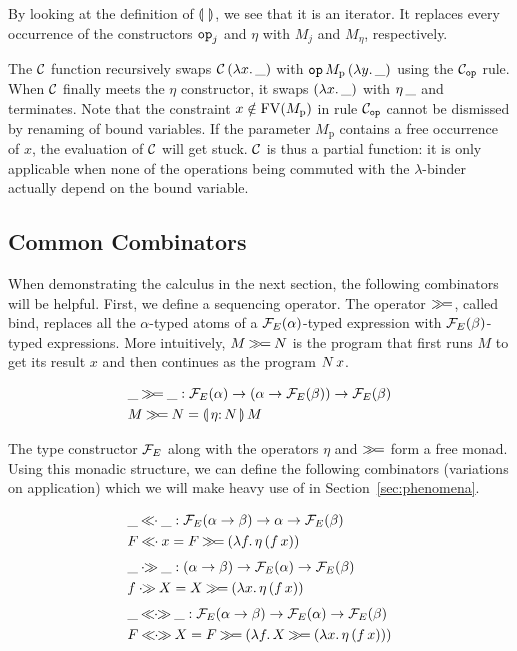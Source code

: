 \documentclass{llncs}
\newcommand{\negSpaceBeforeAlign}{\vspace{-4mm}}
\begin{document}
By looking at the definition of $\llparenthesis \,  \, \rrparenthesis$, we see that it is an
iterator. It replaces every occurrence of the constructors $\mathtt{op}_j$ and
$\eta$ with $M_j$ and $M_\eta$, respectively.

The $\mathcal{C}$ function recursively swaps $\mathcal{C}\,(\lambda x.\, \_)$ with
$\mathtt{op}\,M_{\mathrm{p}}\,(\lambda y.\, \_)$ using the $\mathcal{C}_{\mathtt{op}}$
rule. When $\mathcal{C}$ finally meets the $\eta$ constructor, it swaps
$(\lambda x.\, \_)$ with $\eta\,\_$ and terminates. Note that the
constraint $x \notin \operatorname{FV}(M_{\mathrm{p}})$ in rule $\mathcal{C}_{\mathtt{op}}$ cannot be
dismissed by renaming of bound variables. If the parameter $M_{\mathrm{p}}$
contains a free occurrence of $x$, the evaluation of $\mathcal{C}$ will get
stuck. $\mathcal{C}$ is thus a partial function: it is only applicable when none of
the operations being commuted with the $\lambda$-binder actually depend on
the bound variable.

\subsection{Common Combinators}
\label{ssec:common-combinators}

When demonstrating the calculus in the next section, the following
combinators will be helpful. First, we define a sequencing operator. The
operator $\mathbin{\gg\!=}$, called bind, replaces all the $\alpha$-typed atoms of a
$\mathcal{F}_E(\alpha)$-typed expression with $\mathcal{F}_E(\beta)$-typed
expressions. More intuitively, $M \mathbin{\gg\!=} N$ is the program that first runs
$M$ to get its result $x$ and then continues as the program $N\,x$.

\negSpaceBeforeAlign

\begin{align*}
  & \_ \hsbind \_ : \FF_E(\alpha) \to (\alpha \to \FF_E(\beta)) \to \FF_E(\beta) \\
  & M \hsbind N = \ap{\banana{\onto{\eta}{N}}}{M}
\end{align*}

The type constructor $\mathcal{F}_E$ along with the operators $\eta$ and $\mathbin{\gg\!=}$
form a free monad. Using this monadic structure, we can define the
following combinators (variations on application) which we will make heavy
use of in Section~\ref{sec:phenomena}.

\negSpaceBeforeAlign

\begin{align*}
  & \_ \apl \_ : \FF_E(\alpha \to \beta) \to \alpha \to \FF_E(\beta) \\
  & F \apl x = F \hsbind (\lam{f}{\ap{\eta}{(\ap{f}{x})}}) \\[0.8ex]
  & \_ \apr \_ : (\alpha \to \beta) \to \FF_E(\alpha) \to \FF_E(\beta) \\
  & f \apr X = X \hsbind (\lam{x}{\ap{\eta}{(\ap{f}{x})}}) \\[0.8ex]
  & \_ \aplr \_ : \FF_E(\alpha \to \beta) \to \FF_E(\alpha) \to \FF_E(\beta) \\
  & F \aplr X = F \hsbind (\lam{f}{X \hsbind (\lam{x}{\ap{\eta}{(\ap{f}{x})}})})
\end{align*}
\end{document}
